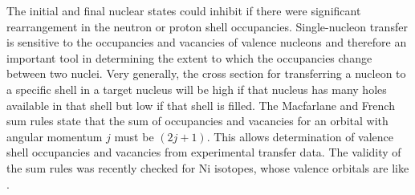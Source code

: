 The initial and final nuclear states could inhibit \zvbb if there were significant rearrangement in the neutron or proton shell occupancies.  Single-nucleon transfer is sensitive to the occupancies and vacancies of valence nucleons and therefore an important tool in determining the extent to which the occupancies change between two nuclei.  Very generally, the cross section for transferring a nucleon to a specific shell in a target nucleus will be high if that nucleus has many holes available in that shell but low if that shell is filled.  The Macfarlane and French \citep{sumRules} sum rules state that the sum of occupancies and vacancies for an orbital with angular momentum $j$ must be $(2j+1)$.  This allows determination of valence shell occupancies and vacancies from experimental transfer data.  The validity of the sum rules was recently checked \citep{SumRulesTest} for Ni isotopes, whose valence orbitals are \fpg like \GeTargets.  

